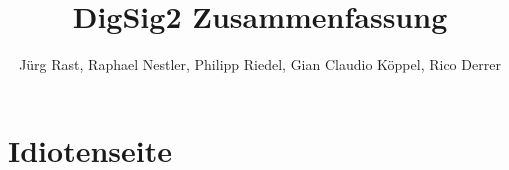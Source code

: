 \documentclass{scrartcl}
\title{DigSig2 Zusammenfassung}
\author{Jürg Rast, Raphael Nestler, Philipp Riedel, Gian Claudio Köppel, Rico Derrer}
\begin{document}
\maketitle
\newpage

\tableofcontents
\newpage

\begin{multicols}{2}

\newpage

\end{multicols}





\section{Idiotenseite}



\begin{multicols}{2}






\end{multicols}

\end{document}
